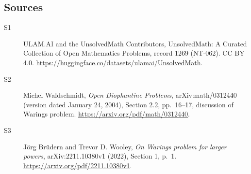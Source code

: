 \documentclass[11pt]{article}
\begin{document}
\subsection{Sources}
\begin{description}
\item[\hypertarget{source:1269:1}{S1}] ULAM.AI and the UnsolvedMath Contributors, UnsolvedMath: A Curated Collection of Open Mathematics Problems, record 1269 (NT-062). CC BY 4.0. \url{https://huggingface.co/datasets/ulamai/UnsolvedMath}.
\item[\hypertarget{source:1269:2}{S2}] Michel Waldschmidt, \emph{Open Diophantine Problems}, arXiv:math/0312440 (version dated January 24, 2004), Section 2.2, pp.\ 16--17, discussion of Waring\textquotesingle s problem. \url{https://arxiv.org/pdf/math/0312440}.
\item[\hypertarget{source:1269:3}{S3}] J\"org Br\"udern and Trevor D. Wooley, \emph{On Waring\textquotesingle s problem for larger powers}, arXiv:2211.10380v1 (2022), Section 1, p.\ 1. \url{https://arxiv.org/pdf/2211.10380v1}.
\end{description}
\label{end:1269}
\end{document}
